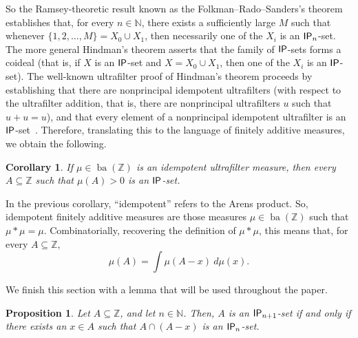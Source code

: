 \documentclass{jloganal}
\newtheorem{prop}[thm]{Proposition}    %
\newtheorem{cor}[thm]{Corollary}          %
\theoremstyle{definition}
\newcommand{\ba}{\mathop{\mathrm{ba}}}
\newcommand{\ip}{\mathnormal{\mathsf{IP}}}
\begin{document}
So the Ramsey-theoretic result known as the Folkman--Rado--Sanders's theorem establishes that, for every $n\in\mathbb N$, there exists a sufficiently large $M$ such that whenever $\{1,2,\ldots,M\}=X_0\cup X_1$, then necessarily one of the $X_i$ is an $\ip_n$-set. The more general Hindman's theorem asserts that the family of $\ip$-sets forms a coideal (that is, if $X$ is an $\ip$-set and $X=X_0\cup X_1$, then one of the $X_i$ is an $\ip$-set). The well-known ultrafilter proof of Hindman's theorem proceeds by establishing that there are nonprincipal idempotent ultrafilters (with respect to the ultrafilter addition, that is, there are nonprincipal ultrafilters $u$ such that $u+u=u$), and that every element of a nonprincipal idempotent ultrafilter is an $\ip$-set~\cite[Theorems 5.12 and 16.4]{Hindman-Strauss}. Therefore, translating this to the language of finitely additive measures, we obtain the following.

\begin{cor}\label{prop:idempotentip}
    If $\mu\in\ba(\mathbb Z)$ is an idempotent ultrafilter measure, then every $A\subseteq\mathbb Z$ such that $\mu(A)>0$ is an $\ip$-set.
\end{cor}

In the previous corollary, ``idempotent'' refers to the Arens product. So, idempotent finitely additive measures are those measures $\mu\in\ba(\mathbb Z)$ such that $\mu*\mu=\mu$. Combinatorially, recovering the definition of $\mu*\mu$, this means that, for every $A\subseteq\mathbb Z$,
\begin{equation*}
    \mu(A)=\int\mu(A-x)\ d\mu(x).
\end{equation*}

We finish this section with a lemma that will be used throughout the paper.

\begin{prop}\label{characterizeipn}
Let $A\subseteq\mathbb Z$, and let $n\in\mathbb N$. Then, $A$ is an $\ip_{n+1}$-set if and only if there exists an $x\in A$ such that $A\cap(A-x)$ is an $\ip_{n}$-set.
\end{prop}
\end{document}
